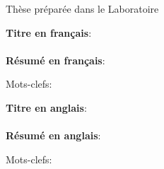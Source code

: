 {\begin{centering}
    \vspace*{1em}
    Thèse préparée dans le Laboratoire \@laboratory\\

    \begin{figure}[H]
      \begin{centering}
      \par\end{centering}
    \end{figure}
  \end{centering}
	
  \cleardoublepage
  
  \newpage
	\begin{flushleft}
    \textbf{{\large Titre en français}}:\\ \@titleFR\\
    \vspace*{1em}
    \textbf{{\large Résumé en français}}:\\ \@resumeFR

    \vfill
    Mots-clefs: \@keywordsFR\\
  \end{flushleft}

  \newpage
  \begin{flushleft}
    \textbf{{\large Titre en anglais}}:\\ \@titleENG\\
    \vspace*{1em}
    \textbf{{\large Résumé en anglais}}:\\ \@resumeENG

    \vfill
    Mots-clefs: \@keywordsENG\\
  \end{flushleft}

\restoregeometry  
}